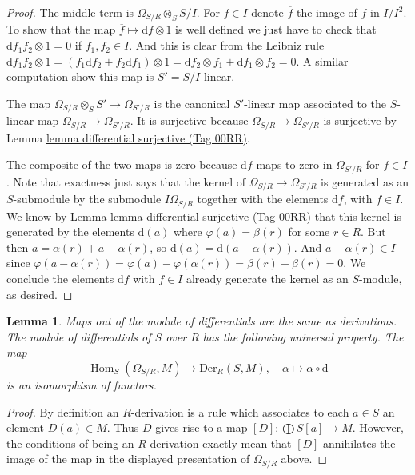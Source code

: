 \documentclass{amsart}
\newenvironment{slogan}{\comment}{\endcomment}
\theoremstyle{plain}
\newtheorem{lemma}[subsection]{Lemma}
\theoremstyle{definition}
\theoremstyle{remark}
\numberwithin{equation}{subsection}
\def\Hom{\mathop{\mathrm{Hom}}\nolimits}
\begin{document}
\begin{proof}
The middle term is $\Omega_{S/R} \otimes_S S/I$.
For $f \in I$ denote $\overline{f}$ the image of $f$ in $I/I^2$.
To show that the map $\overline{f} \mapsto \text{d}f \otimes 1$
is well defined we just have to check that
$\text{d} f_1f_2 \otimes 1 = 0$ if $f_1, f_2 \in I$.
And this is clear from the Leibniz rule
$\text{d} f_1f_2 \otimes 1 = (f_1 \text{d}f_2 + f_2 \text{d} f_1 )\otimes 1 =
\text{d}f_2 \otimes f_1 + \text{d}f_1 \otimes f_2 = 0$.
A similar computation show this map is $S' = S/I$-linear.

\medskip\noindent
The map $\Omega_{S/R} \otimes_S S' \to \Omega_{S'/R}$
is the canonical $S'$-linear map associated to the
$S$-linear map $\Omega_{S/R} \to \Omega_{S'/R}$.
It is surjective because $\Omega_{S/R} \to \Omega_{S'/R}$
is surjective by Lemma \href{https://stacks.math.columbia.edu/tag/00RR}{lemma differential surjective (Tag 00RR)}.

\medskip\noindent
The composite of the two maps is zero because
$\text{d}f$ maps to zero in $\Omega_{S'/R}$
for $f \in I$. Note that exactness just says that
the kernel of $\Omega_{S/R} \to \Omega_{S'/R}$
is generated as an $S$-submodule by the submodule $I\Omega_{S/R}$ together
with the elements $\text{d}f$, with $f \in I$. We know by
Lemma \href{https://stacks.math.columbia.edu/tag/00RR}{lemma differential surjective (Tag 00RR)}
that this kernel is generated by the elements $\text{d}(a)$
where $\varphi(a) = \beta(r)$ for some $r \in R$.
But then $a = \alpha(r) + a - \alpha(r)$, so
$\text{d}(a) = \text{d}(a - \alpha(r))$. And
$a - \alpha(r) \in I$ since $\varphi(a - \alpha(r)) =
\varphi(a) - \varphi(\alpha(r)) = \beta(r) - \beta(r) = 0$.
We conclude the elements $\text{d}f$ with $f \in I$ already
generate the kernel as an $S$-module, as desired.
\end{proof}


\begin{lemma}
\label{lemma-universal-omega}
\begin{slogan}
Maps out of the module of differentials are the same as derivations.
\end{slogan}
The module of differentials of $S$ over $R$ has the following
universal property. The map
$$
\Hom_S(\Omega_{S/R}, M)
\longrightarrow
\text{Der}_R(S, M), \quad
\alpha
\longmapsto
\alpha \circ \text{d}
$$
is an isomorphism of functors.
\end{lemma}

\begin{proof}
By definition an $R$-derivation is a rule which associates
to each $a \in S$ an element $D(a) \in M$. Thus $D$ gives
rise to a map $[D] : \bigoplus S[a] \to M$. However, the conditions
of being an $R$-derivation exactly mean that $[D]$ annihilates
the image of the map in the displayed presentation of
$\Omega_{S/R}$ above.
\end{proof}
\end{document}
